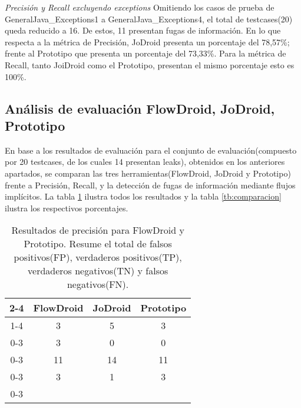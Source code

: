 \textit{Precisión y Recall excluyendo exceptions}\newline
Omitiendo los casos de prueba de GeneralJava\_Exceptions1 a
GeneralJava\_Exceptions4, el total de testcases(20) queda reducido a 16. De
estos, 11 presentan fugas de información.\newline
En lo que respecta a la métrica de Precisión, JoDroid
presenta un porcentaje del 78,57\%; frente al Prototipo que presenta un
porcentaje del 73,33\%.\newline 
Para la métrica de Recall, tanto JoiDroid como el Prototipo, presentan el mismo
porcentaje esto es 100\%.\newline



\subsection{Análisis de evaluación FlowDroid, JoDroid, Prototipo}
\label{subsec:fjp}

En base a los resultados de evaluación para el conjunto de
evaluación(compuesto por 20 testcases, de los cuales 14 presentan leaks),
obtenidos en los anteriores apartados, 
se comparan las tres herramientas(FlowDroid, JoDroid y Prototipo) frente a
Precisión, Recall, y la detección de fugas de información mediante flujos
implícitos. La tabla \ref{tb:porcentajes} ilustra todos los resultados y la
tabla \ref{tb:comparacion} ilustra los respectivos porcentajes.

\begin{table}[t!]
\begin{center}
\begin{tabular}{c|c|c|c|}
\cline{2-4}
& \cellcolor{gray!30}FlowDroid & \cellcolor{gray!30}JoDroid &
\cellcolor{gray!30}Prototipo \\
\cline{1-4}
\multicolumn{0}{ |c|  }{\multirow{0}{*}{FP} }  & 3 & 5 & 3\\ \cline{0-3}
\multicolumn{0}{ |c|  }{\multirow{0}{*}{FN} }  & 3 & 0 & 0\\ \cline{0-3}
\multicolumn{0}{ |c|  }{\multirow{0}{*}{TP} }  & 11 & 14 & 11\\\cline{0-3}
\multicolumn{0}{ |c|  }{\multirow{0}{*}{TN} }  & 3 & 1 &  3\\ \cline{0-3}
\end{tabular}
\end{center}
\caption{Resultados de precisión para FlowDroid y Prototipo. Resume el total de
falsos positivos(FP), verdaderos positivos(TP), verdaderos negativos(TN) y
falsos negativos(FN).}
\label{tb:porcentajes}
\end{table}

